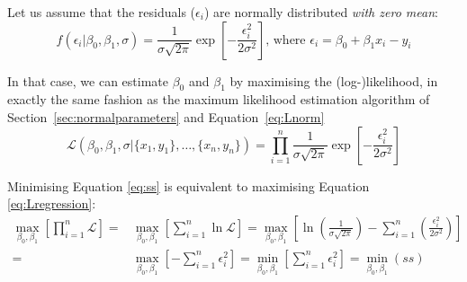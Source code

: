 Let us assume that the residuals ($\epsilon_i$) are normally
distributed \emph{with zero mean}:
\begin{equation}
  f(\epsilon_i|\beta_0,\beta_1,\sigma) = \frac{1}{\sigma\sqrt{2\pi}}
  \exp\!\left[-\frac{\epsilon_i^2}{2\sigma^2}\right] \mbox{,~where~}
  \epsilon_i = \beta_0 + \beta_1 x_i - y_i
  \label{eq:normalresid}
\end{equation}

In that case, we can estimate $\beta_0$ and $\beta_1$ by maximising
the (log-)likelihood, in exactly the same fashion as the maximum
likelihood estimation algorithm of Section~\ref{sec:normalparameters}
and Equation~\ref{eq:Lnorm}
\begin{equation}
  \mathcal{L}(\beta_0,\beta_1,\sigma|\{x_1,y_1\},\ldots,\{x_n,y_n\}) =
  \prod\limits_{i=1}^{n}\frac{1}{\sigma\sqrt{2\pi}}
  \exp\!\left[-\frac{\epsilon_i^2}{2\sigma^2}\right]
  \label{eq:Lregression}
\end{equation}

Minimising Equation \ref{eq:ss} is equivalent to maximising Equation
\ref{eq:Lregression}:
\begin{equation}
\begin{split}
\underset{\beta_0,\beta_1}{\max}\left[\prod_{i=1}^n \mathcal{L}\right] = &
\underset{\beta_0,\beta_1}{\max}\left[\sum_{i=1}^n \ln\mathcal{L}\right] =
\underset{\beta_0,\beta_1}{\max}\left[\ln\!\left(\frac{1}{\sigma\sqrt{2\pi}}\right)-\sum_{i=1}^n\left(\frac{\epsilon_i^2}{2\sigma^2}\right)\right] \\
= & \underset{\beta_0,\beta_1}{\max}\left[-\sum_{i=1}^n\epsilon_i^2\right] = 
\underset{\beta_0,\beta_1}{\min}\left[\sum_{i=1}^{n} \epsilon_i^2\right] = \underset{\beta_0,\beta_1}{\min}(ss)
\end{split}
\end{equation}

